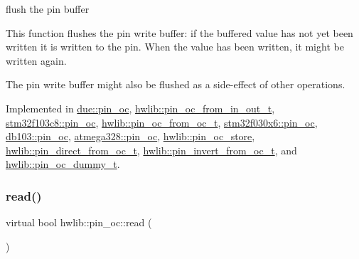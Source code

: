 flush the pin buffer

This function flushes the pin write buffer\+: if the buffered value has not yet been written it is written to the pin. When the value has been written, it might be written again.

The pin write buffer might also be flushed as a side-\/effect of other operations. 

Implemented in \hyperlink{classdue_1_1pin__oc_a911e67dbcc0005b3eae0d511f576a215}{due\+::pin\+\_\+oc}, \hyperlink{classhwlib_1_1pin__oc__from__in__out__t_add08ce2c564c20a9aea9bac915123929}{hwlib\+::pin\+\_\+oc\+\_\+from\+\_\+in\+\_\+out\+\_\+t}, \hyperlink{classstm32f103c8_1_1pin__oc_ac86dbc1c7430d2dbdee190ee87b2e35e}{stm32f103c8\+::pin\+\_\+oc}, \hyperlink{classhwlib_1_1pin__oc__from__oc__t_a20b667326a27ae3156874fc308d4e795}{hwlib\+::pin\+\_\+oc\+\_\+from\+\_\+oc\+\_\+t}, \hyperlink{classstm32f030x6_1_1pin__oc_afa293f1a0ee8f1cb4936521df144453e}{stm32f030x6\+::pin\+\_\+oc}, \hyperlink{classdb103_1_1pin__oc_a9aa19305905fe3a647fe1fa50a243dae}{db103\+::pin\+\_\+oc}, \hyperlink{classatmega328_1_1pin__oc_a3eb816793385d952d5fb00f473b07349}{atmega328\+::pin\+\_\+oc}, \hyperlink{classhwlib_1_1pin__oc__store_a34885dcd712db6db9fc5ef9559ac34de}{hwlib\+::pin\+\_\+oc\+\_\+store}, \hyperlink{classhwlib_1_1pin__direct__from__oc__t_a3009f8da456f04e889ee1d81e8bcf0b4}{hwlib\+::pin\+\_\+direct\+\_\+from\+\_\+oc\+\_\+t}, \hyperlink{classhwlib_1_1pin__invert__from__oc__t_ad470fa699bc65083d65190ff22efe600}{hwlib\+::pin\+\_\+invert\+\_\+from\+\_\+oc\+\_\+t}, and \hyperlink{classhwlib_1_1pin__oc__dummy__t_ab3eb9b3c0a350944f791adf194e2f9ab}{hwlib\+::pin\+\_\+oc\+\_\+dummy\+\_\+t}.

\mbox{\label{classhwlib_1_1pin__oc_a51180afd605add59b96105fa98e29f88}} 
\subsubsection{\texorpdfstring{read()}{read()}}
{\footnotesize\ttfamily virtual bool hwlib\+::pin\+\_\+oc\+::read (\begin{DoxyParamCaption}{ }\end{DoxyParamCaption})\hspace{0.3cm}{\ttfamily [pure virtual]}}





